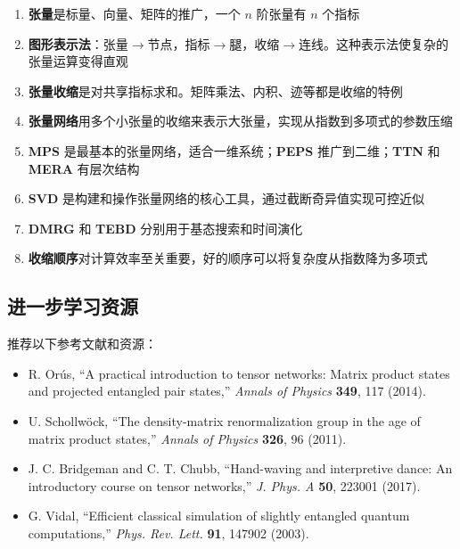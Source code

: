 \documentclass[12pt,a4paper]{ctexart}
\begin{document}
\begin{enumerate}
    \item \textbf{张量}是标量、向量、矩阵的推广，一个 $n$ 阶张量有 $n$ 个指标

    \item \textbf{图形表示法}：张量$\to$节点，指标$\to$腿，收缩$\to$连线。这种表示法使复杂的张量运算变得直观

    \item \textbf{张量收缩}是对共享指标求和。矩阵乘法、内积、迹等都是收缩的特例

    \item \textbf{张量网络}用多个小张量的收缩来表示大张量，实现从指数到多项式的参数压缩

    \item \textbf{MPS} 是最基本的张量网络，适合一维系统；\textbf{PEPS} 推广到二维；\textbf{TTN} 和 \textbf{MERA} 有层次结构

    \item \textbf{SVD} 是构建和操作张量网络的核心工具，通过截断奇异值实现可控近似

    \item \textbf{DMRG} 和 \textbf{TEBD} 分别用于基态搜索和时间演化

    \item \textbf{收缩顺序}对计算效率至关重要，好的顺序可以将复杂度从指数降为多项式
\end{enumerate}

\subsection{进一步学习资源}

推荐以下参考文献和资源：
\begin{itemize}
    \item R. Or\'us, ``A practical introduction to tensor networks: Matrix product states and projected entangled pair states,'' \textit{Annals of Physics} \textbf{349}, 117 (2014).
    \item U. Schollw\"ock, ``The density-matrix renormalization group in the age of matrix product states,'' \textit{Annals of Physics} \textbf{326}, 96 (2011).
    \item J. C. Bridgeman and C. T. Chubb, ``Hand-waving and interpretive dance: An introductory course on tensor networks,'' \textit{J. Phys. A} \textbf{50}, 223001 (2017).
    \item G. Vidal, ``Efficient classical simulation of slightly entangled quantum computations,'' \textit{Phys. Rev. Lett.} \textbf{91}, 147902 (2003).
\end{itemize}
\end{document}
